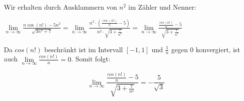\item Wir erhalten durch Ausklammern von $n^2$ im Zähler und Nenner:

$\lim\limits_{n\to\infty}\frac{n\cos(n!)-5n^2}{\sqrt{3n^4+7}} = \lim\limits_{n\to\infty}\frac{n^2 \cdot (\frac{\cos(n!)}{n}-5)}{n^2 \cdot \sqrt{3+\frac{7}{n^4}}} = \lim\limits_{n\to\infty}\frac{\frac{cos(n!)}{n}-5}{\sqrt{3+\frac{7}{n^4}}}$

Da $cos(n!)$ beschränkt ist im Intervall $[-1,1]$ und $\frac{1}{n}$ gegen $0$ konvergiert, ist auch $\lim\limits_{n\to\infty}\frac{cos(n!)}{n} = 0$. Somit folgt:

$$\lim\limits_{n\to\infty}\frac{\frac{cos(n!)}{n}-5}{\sqrt{3+\frac{7}{n^4}}} = -\frac{5}{\sqrt{3}}$$

